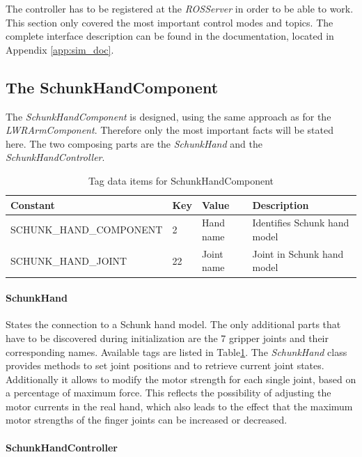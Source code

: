The controller has to be registered at the \emph{ROSServer} in order to be able to work. This section only covered the most important control modes and topics. The complete interface description can be found in the documentation, located in Appendix \ref{app:sim_doc}.

\subsection{The SchunkHandComponent}

The \emph{SchunkHandComponent} is designed, using the same approach as for the \emph{LWRArmComponent}. Therefore only the most important facts will be stated here. The two composing parts are the \emph{SchunkHand} and the \emph{SchunkHandController}.
\begin{table}[h]
  \centering
  \begin{tabularx}{\textwidth}{|l|l|l|X|} \hline
	\textbf{Constant} & \textbf{Key} & \textbf{Value} & \textbf{Description} \\ \hline
	SCHUNK\_HAND\_COMPONENT & 2 & Hand name & Identifies Schunk hand model \\
	SCHUNK\_HAND\_JOINT & 22 & Joint name & Joint in Schunk hand model \\ \hline
  \end{tabularx}
  \caption{Tag data items for SchunkHandComponent}
  \label{fig:schunk_tags}
\end{table}

\paragraph{SchunkHand}

States the connection to a Schunk hand model. The only additional parts that have to be discovered during initialization are the 7 gripper joints and their corresponding names. Available tags are
listed in Table\ref{fig:schunk_tags}. The \emph{SchunkHand} class provides methods to set joint positions and to retrieve current joint states. Additionally it allows to modify the motor strength for each single joint, based on a percentage of maximum force. This reflects the possibility of adjusting the motor currents in the real hand, which also leads to the effect that the maximum motor strengths of the finger joints can be increased or decreased.

\paragraph{SchunkHandController}

